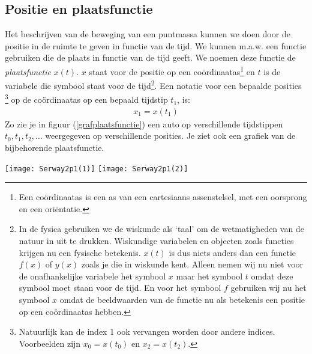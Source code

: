 \documentclass{ximera}
\begin{document}
	\author{Bart Lambregs}
    \xmsource

	
	\subsection{Positie en plaatsfunctie}
	
	Het beschrijven van de beweging van een puntmassa kunnen we doen door de positie in de ruimte te geven in functie van de tijd. We kunnen m.a.w. een functie gebruiken die de plaats in functie van de tijd geeft. We noemen deze functie de \emph{plaatsfunctie} $x(t)$. $x$ staat voor de positie op een co\"ordinaatas\footnote{Een co\"ordinaatas is een as van een cartesiaans assenstelsel, met een oorsprong en een ori\"entatie.} en $t$ is de variabele die symbool staat voor de tijd\footnote{In de fysica gebruiken we de wiskunde als `taal' om de wetmatigheden van de natuur in uit te drukken. Wiskundige variabelen en objecten zoals functies krijgen nu een fysische betekenis. $x(t)$ is dus niets anders dan een functie $f(x)$ of $y(x)$ zoals je die in wiskunde kent. Alleen nemen wij nu niet voor de onafhankelijke variabele het symbool $x$ maar het symbool $t$ omdat deze symbool moet staan voor de tijd. En voor het symbool $f$ gebruiken wij nu het symbool $x$ omdat de beeldwaarden van de functie nu als betekenis een positie op een co\"ordinaatas hebben.}. Een notatie voor een bepaalde posities \footnote{Natuurlijk kan de index 1 ook vervangen worden door andere indices. Voorbeelden zijn $x_0=x(t_0)$ en $x_2=x(t_2)$.} op de co\"ordinaatas op een bepaald tijdstip $t_1$, is:
	\begin{eqnarray*}
	x_1=x(t_1)
	\end{eqnarray*}
	Zo zie je in figuur (\ref{grafplaatsfunctie}) een auto op verschillende tijdstippen $t_0,t_1, t_2,\ldots$ weer\-ge\-ge\-ven op verschillende posities. Je ziet ook een grafiek van de bijbehorende plaatsfunctie.
	
	\begin{image}
	\hfill
	\texttt{[image: Serway2p1(1)]}
	\hfill
	\texttt{[image: Serway2p1(2)]}
	\hfill
	
	\end{image}
	
\end{document}
